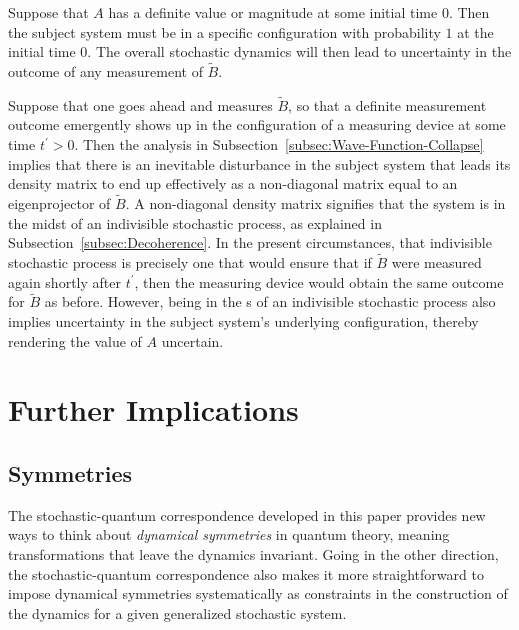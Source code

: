 \documentclass[12pt,english,prl,superscriptaddress,nobibnotes,nofootinbib]{revtex4-2}
\begin{document}
Suppose that $A$ has a definite value or magnitude at some initial
time $0$. Then the subject system must be in a specific configuration
with probability $1$ at the initial time $0$. The overall stochastic
dynamics will then lead to uncertainty in the outcome of any measurement
of $\tilde{B}$.

Suppose that one goes ahead and measures $\tilde{B}$, so that a definite
measurement outcome emergently shows up in the configuration of a
measuring device at some time $t^{\prime}>0$. Then the analysis in
Subsection~\ref{subsec:Wave-Function-Collapse} implies that there
is an inevitable disturbance in the subject system that leads its
density matrix to end up effectively as a non-diagonal matrix equal
to an eigenprojector of $\tilde{B}$. A non-diagonal density matrix
signifies  that the system is in the midst of an indivisible stochastic
process, as explained in Subsection~\ref{subsec:Decoherence}. In
the present circumstances, that indivisible stochastic process is
precisely one that would ensure that if $\tilde{B}$ were measured
again shortly after $t^{\prime}$, then the measuring device would
obtain the same outcome for $\tilde{B}$ as before. However, being
in the s of an indivisible stochastic process also implies uncertainty
in the subject system's underlying configuration, thereby rendering
the value of $A$ uncertain.

\section{Further Implications\label{sec:Further-Implications}}

\subsection{Symmetries\label{subsec:Symmetries}}

The stochastic-quantum correspondence developed in this paper provides
new ways to think about \emph{dynamical symmetries} in quantum theory,
meaning transformations that leave the dynamics invariant. Going in
the other direction, the stochastic-quantum correspondence also makes
it more straightforward to impose dynamical symmetries systematically
as constraints in the construction of the dynamics for a given generalized
stochastic system.
\end{document}
